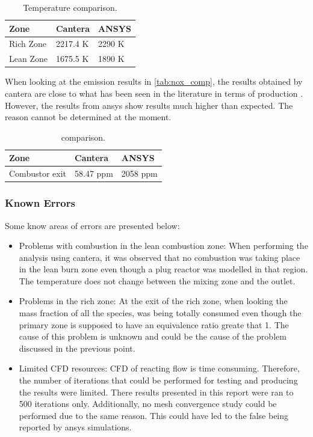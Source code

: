 \begin{table}[H]
    \caption{Temperature comparison.}\label{tab:temp_comp}
    \label{tab:temp_comp}
    \centering
    \begin{tabular}{lll}
    \toprule
    \textbf{Zone} & \textbf{Cantera} & \textbf{ANSYS} \\ 
    \midrule
        Rich Zone & 2217.4 K &   2290 K \\
        Lean Zone & 1675.5 K &   1890 K \\
    \bottomrule
\end{tabular}
\end{table}

When looking at the emission results in \autoref{tab:nox_comp}, the results obtained by cantera are close to what has been seen in the literature in terms of  production \cite{samuelsen2006rich}. However, the results from ansys show  results much higher than expected. The reason cannot be determined at the moment.


\begin{table}[H]
    \caption{ comparison.}\label{tab:nox_comp}
    \label{tab:temp_comp}
    \centering
    \begin{tabular}{lll}
    \toprule
    \textbf{Zone} & \textbf{Cantera} & \textbf{ANSYS} \\ 
    \midrule
    Combustor exit & 58.47 ppm &   2058 ppm \\
    \bottomrule
    \end{tabular}
\end{table}


\subsubsection{Known Errors}

Some know areas of errors are presented below:

\begin{itemize}
    \item Problems with combustion in the lean combustion zone: When performing the analysis using cantera, it was observed that no combustion was taking place in the lean burn zone even though a plug reactor was modelled in that region. The temperature does not change between the mixing zone and the outlet.
    
    \item Problems in the rich zone: At the exit of the rich zone, when looking the mass fraction of all the species,  was being totally consumed even though the primary zone is supposed to have an equivalence ratio greate that 1. The cause of this problem is unknown and could be the cause of the problem discussed in the previous point.

    \item Limited CFD resources: CFD of reacting flow is time consuming. Therefore, the number of iterations that could be performed for testing and producing the results were limited. There results presented in this report were ran to 500 iterations only. Additionally, no mesh convergence study could be performed due to the same reason. This could have led to the false  being reported by ansys simulations.
\end{itemize}